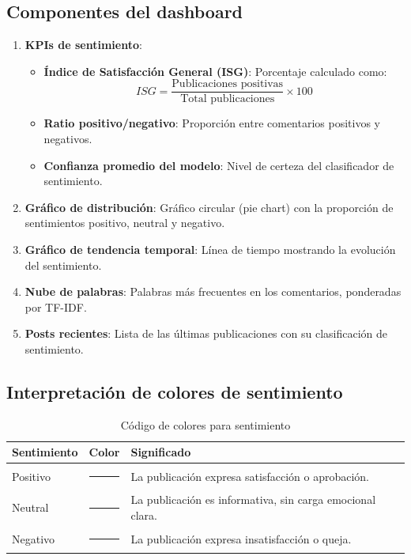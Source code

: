 \documentclass[12pt,a4paper]{article}
\begin{document}
\subsection{Componentes del dashboard}
\begin{enumerate}
  \item \textbf{KPIs de sentimiento}:
  \begin{itemize}
    \item \textbf{Índice de Satisfacción General (ISG)}: Porcentaje calculado como:
    $$ISG = \frac{\text{Publicaciones positivas}}{\text{Total publicaciones}} \times 100$$
    \item \textbf{Ratio positivo/negativo}: Proporción entre comentarios positivos y negativos.
    \item \textbf{Confianza promedio del modelo}: Nivel de certeza del clasificador de sentimiento.
  \end{itemize}
  \item \textbf{Gráfico de distribución}: Gráfico circular (pie chart) con la proporción de sentimientos positivo, neutral y negativo.
  \item \textbf{Gráfico de tendencia temporal}: Línea de tiempo mostrando la evolución del sentimiento.
  \item \textbf{Nube de palabras}: Palabras más frecuentes en los comentarios, ponderadas por TF-IDF.
  \item \textbf{Posts recientes}: Lista de las últimas publicaciones con su clasificación de sentimiento.
\end{enumerate}

\subsection{Interpretación de colores de sentimiento}
\begin{table}[H]
\centering
\begin{tabular}{lcl}
\toprule
\textbf{Sentimiento} & \textbf{Color} & \textbf{Significado} \\
\midrule
Positivo & \textcolor{green!60!black}{\rule{1cm}{0.4cm}} & La publicación expresa satisfacción o aprobación. \\
Neutral  & \textcolor{gray}{\rule{1cm}{0.4cm}} & La publicación es informativa, sin carga emocional clara. \\
Negativo & \textcolor{red!70!black}{\rule{1cm}{0.4cm}} & La publicación expresa insatisfacción o queja. \\
\bottomrule
\end{tabular}
\caption{Código de colores para sentimiento}
\end{table}
\end{document}
